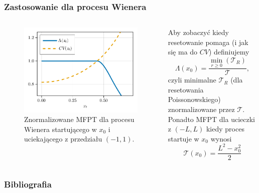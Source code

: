 \documentclass{beamer}
\newcommand{\1}{\mathbb{1}}
\newcommand{\T}{\mathcal{T}}
\begin{document}
\begin{frame}
\frametitle{Zastosowanie dla  procesu Wienera}
\begin{columns}
\begin{figure}
\includegraphics[width=\textwidth]{wiener-sim/CV-MFPT.pdf}
\caption{Znormalizowane MFPT dla procesu Wienera startującego w $x_0$ i uciekającego z przedziału $(-1, 1)$.}
\end{figure}

Aby zobaczyć kiedy resetowanie pomaga (i jak się ma do $CV$) definiujemy
\begin{equation}
\Lambda(x_0) = \frac{\min_{r \ge 0}{(\T_R)}}{\T},
\end{equation}
czyli minimalne $\T_R$ (dla resetowania Poissonowskiego) znormalizowane przez $\T$.\\
Ponadto MFPT dla ucieczki z $(-L, L)$ kiedy proces startuje w $x_0$ wynosi
\begin{equation}
\T(x_0) = \frac{L^2 - x^2_0}{2}
\end{equation}
\end{columns}

\end{frame}


\begin{frame}
\frametitle{Bibliografia}
\end{frame}
\end{document}

